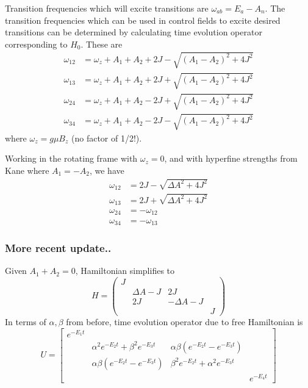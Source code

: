 \documentclass[12pt]{article}
\begin{document}
Transition frequencies which will excite transitions are $\omega_{ab}=E_a-A_n$. The transition frequencies which can be used in control fields to excite desired transitions can be determined by calculating time evolution operator corresponding to $H_0$. These are
\begin{align}
    \omega_{12} &= \omega_z+A_1+A_2+2J-\sqrt{(A_1-A_2)^2+4J^2}\\
    \omega_{13} &= \omega_z+A_1+A_2+2J+\sqrt{(A_1-A_2)^2+4J^2}\\
    \omega_{24} &= \omega_z+A_1+A_2-2J+\sqrt{(A_1-A_2)^2+4J^2}\\
    \omega_{34} &= \omega_z+A_1+A_2-2J-\sqrt{(A_1-A_2)^2+4J^2}
\end{align}
where $\omega_z = g\mu B_z$ (no factor of 1/2!).

Working in the rotating frame with $\omega_z=0$, and with hyperfine strengths from Kane where $A_1=-A_2$, we have
\begin{align}
    \omega_{12} &= 2J-\sqrt{\Delta A^2+4J^2}\\
    \omega_{13} &= 2J+\sqrt{\Delta A^2+4J^2}\\
    \omega_{24} &= -\omega_{12}\\
    \omega_{34} &= -\omega_{13}
\end{align}

\subsubsection{More recent update..}
Given $A_1+A_2=0$, Hamiltonian simplifies to
\begin{equation}
    H = \begin{pmatrix}
        J \\ &\Delta A-J &2J\\ &2J &-\Delta A-J\\ & & &J
    \end{pmatrix}
\end{equation}
In terms of $\alpha,\beta$ from before, time evolution operator due to free Hamiltonian is
\begin{equation}
    U=\begin{bmatrix}
    e^{-E_1t}\\ & \alpha^2e^{-E_2t}+\beta^2e^{-E_3t} &\alpha\beta\left(e^{-E_2t}-e^{-E_3t}\right)\\
    &\alpha\beta\left(e^{-E_2t}-e^{-E_3t}\right) &\beta^2e^{-E_2t}+\alpha^2e^{-E_3t}\\
    & & &e^{-E_4t}\end{bmatrix}
\end{equation}
\end{document}
